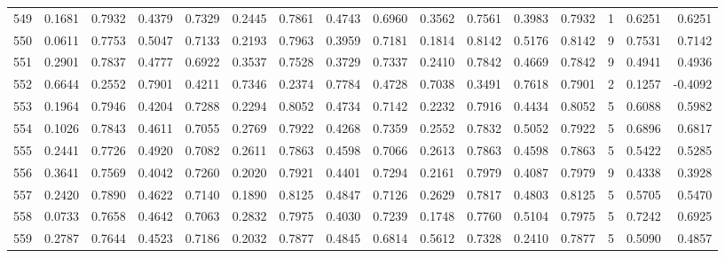 \begin{tabular}{lrrrrrrrrrrrrrrr}
549 &      0.1681 &  0.7932 &  0.4379 &  0.7329 &  0.2445 &  0.7861 &  0.4743 &  0.6960 &  0.3562 &  0.7561 &   0.3983 &     0.7932 &      1 &                    0.6251 &                     0.6251 \\
550 &      0.0611 &  0.7753 &  0.5047 &  0.7133 &  0.2193 &  0.7963 &  0.3959 &  0.7181 &  0.1814 &  0.8142 &   0.5176 &     0.8142 &      9 &                    0.7531 &                     0.7142 \\
551 &      0.2901 &  0.7837 &  0.4777 &  0.6922 &  0.3537 &  0.7528 &  0.3729 &  0.7337 &  0.2410 &  0.7842 &   0.4669 &     0.7842 &      9 &                    0.4941 &                     0.4936 \\
552 &      0.6644 &  0.2552 &  0.7901 &  0.4211 &  0.7346 &  0.2374 &  0.7784 &  0.4728 &  0.7038 &  0.3491 &   0.7618 &     0.7901 &      2 &                    0.1257 &                    -0.4092 \\
553 &      0.1964 &  0.7946 &  0.4204 &  0.7288 &  0.2294 &  0.8052 &  0.4734 &  0.7142 &  0.2232 &  0.7916 &   0.4434 &     0.8052 &      5 &                    0.6088 &                     0.5982 \\
554 &      0.1026 &  0.7843 &  0.4611 &  0.7055 &  0.2769 &  0.7922 &  0.4268 &  0.7359 &  0.2552 &  0.7832 &   0.5052 &     0.7922 &      5 &                    0.6896 &                     0.6817 \\
555 &      0.2441 &  0.7726 &  0.4920 &  0.7082 &  0.2611 &  0.7863 &  0.4598 &  0.7066 &  0.2613 &  0.7863 &   0.4598 &     0.7863 &      5 &                    0.5422 &                     0.5285 \\
556 &      0.3641 &  0.7569 &  0.4042 &  0.7260 &  0.2020 &  0.7921 &  0.4401 &  0.7294 &  0.2161 &  0.7979 &   0.4087 &     0.7979 &      9 &                    0.4338 &                     0.3928 \\
557 &      0.2420 &  0.7890 &  0.4622 &  0.7140 &  0.1890 &  0.8125 &  0.4847 &  0.7126 &  0.2629 &  0.7817 &   0.4803 &     0.8125 &      5 &                    0.5705 &                     0.5470 \\
558 &      0.0733 &  0.7658 &  0.4642 &  0.7063 &  0.2832 &  0.7975 &  0.4030 &  0.7239 &  0.1748 &  0.7760 &   0.5104 &     0.7975 &      5 &                    0.7242 &                     0.6925 \\
559 &      0.2787 &  0.7644 &  0.4523 &  0.7186 &  0.2032 &  0.7877 &  0.4845 &  0.6814 &  0.5612 &  0.7328 &   0.2410 &     0.7877 &      5 &                    0.5090 &                     0.4857 \\

\end{tabular}
